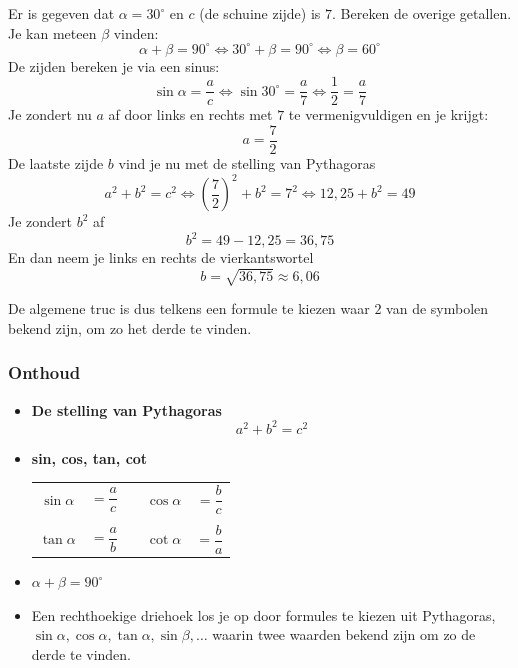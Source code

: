 \begin{voorbeeld}
	Er is gegeven dat $\alpha = 30^\circ$ en $c$ (de schuine zijde) is $7$. Bereken de overige getallen.\\
Je kan meteen $\beta$ vinden:
\[\alpha+\beta=90^\circ \Leftrightarrow 30^\circ + \beta = 90^\circ \Leftrightarrow \beta = 60^\circ\]
De zijden bereken je via een sinus:
\[\sin \alpha = \frac{a}{c}\Leftrightarrow \sin 30^\circ = \frac{a}{7}\Leftrightarrow \frac{1}{2}=\frac{a}{7}\]
Je zondert nu $a$ af door links en rechts met $7$ te vermenigvuldigen en je krijgt:
\[a = \frac{7}{2}\]
De laatste zijde $b$ vind je nu met de stelling van Pythagoras
\[a^2+b^2=c^2 \Leftrightarrow \left(\frac{7}{2}\right)^2+b^2=7^2 \Leftrightarrow 12,25+b^2=49\]
Je zondert $b^2$ af
\[b^2=49-12,25=36,75\]
En dan neem je links en rechts de vierkantswortel
\[b=\sqrt{36,75}\approx 6,06\]
\end{voorbeeld}

De algemene truc is dus telkens een formule te kiezen waar $2$ van de symbolen bekend zijn, om zo het derde te vinden.

\subsubsection{Onthoud}
\begin{onthoud}

\begin{itemize}
	\item \textbf{De stelling van Pythagoras}
	\[a^2+b^2=c^2\]
	\item \textbf{sin, cos, tan, cot}
	\begin{center}
\begin{tabular}{ccccc}
$\sin \alpha$ &$= \dfrac{a}{c}$ &\qquad\qquad\qquad& $\cos \alpha$ &$= \dfrac{b}{c}$\\
&&&&\\
$\tan \alpha$ &$= \dfrac{a}{b}$ &\qquad\qquad\qquad& $\cot \alpha$ &$= \dfrac{b}{a}$
\end{tabular}
\end{center}
	\item $\alpha + \beta = 90^\circ$
	\item Een rechthoekige driehoek los je op door formules te kiezen uit Pythagoras, $\sin \alpha, \cos \alpha, \tan\alpha, \sin \beta, \ldots$ waarin twee waarden bekend zijn om zo de derde te vinden.
\end{itemize}
\end{onthoud}


